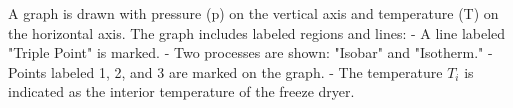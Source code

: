 A graph is drawn with pressure (p) on the vertical axis and temperature (T) on the horizontal axis. The graph includes labeled regions and lines:  
- A line labeled "Triple Point" is marked.  
- Two processes are shown: "Isobar" and "Isotherm."  
- Points labeled 1, 2, and 3 are marked on the graph.  
- The temperature \( T_i \) is indicated as the interior temperature of the freeze dryer.